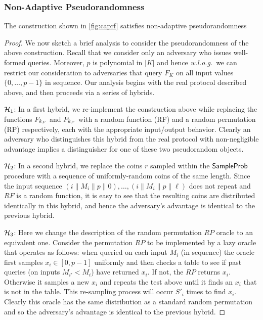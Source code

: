 \subsubsection{Non-Adaptive Pseudorandomness}

\begin{theorem}
	The construction shown in \cref{fig:caprf} satisfies non-adaptive pseudorandomness
\end{theorem}

\begin{proof}
	We now sketch a brief analysis to consider the pseudorandomness of the above construction.
	Recall that we consider only an adversary who issues well-formed queries.
	Moreover, $p$ is polynomial in $|K|$ and hence {\em w.l.o.g.}\ we can restrict our consideration to adversaries that query $F_K$ on all input values $\{0, \dots, p-1\}$ in sequence.
	Our analysis begins with the real protocol described above, and then proceeds via a series of hybrids.

	$\mathcal{H}_1$: In a first hybrid, we re-implement the construction above while replacing the functions $F_{k_{F}}$ and $P_{k_{P}}$ with a random function (RF) and a random permutation (RP) respectively, each with the appropriate input/output behavior.
	Clearly an adversary who distinguishes this hybrid from the real protocol with non-negligible advantage implies a distinguisher for one of these two pseudorandom objects.

	$\mathcal{H}_2$: In a second hybrid, we replace the coins $r$ sampled within the $\mathsf{SampleProb}$ procedure with a sequence of uniformly-random coins of the same length.
	Since the input sequence $(i \| M_i \| p \| 0), \dots, (i \| M_i \| p \| \ell)$ does not repeat and $RF$ is a random function, it is easy to see that the resulting coins are distributed identically in this hybrid, and hence the adversary's advantage is identical to the previous hybrid.

	$\mathcal{H}_3$: Here we change the description of the random permutation $RP$ oracle to an equivalent one.
	Consider the permutation $RP$ to be implemented by a lazy oracle that operates as follows: when queried on each input $M_i$ (in sequence) the oracle first samples $x_i \in [0,p-1]$ uniformly and then checks a table to see if past queries (on inputs $M_{i'} < M_i$) have returned $x_i$.
	If not, the $RP$ returns $x_i$.
	Otherwise it samples a new $x_i$ and repeats the test above until it finds an $x_i$ that is not in the table.
	This re-sampling process will occur $S'_i$ times to find $x_i$.
	Clearly this oracle has the same distribution as a standard random permutation and so the adversary's advantage is identical to the previous hybrid.


\end{proof}
